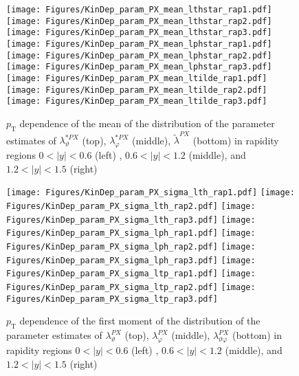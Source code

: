 \documentclass[12pt]{article}
\newcommand{\pT}{p_\mathrm{T}}
\newcommand{\absy}{\left |  y \right |}
\newcommand{\lamthPX}{\lambda^{\scriptscriptstyle PX}_\vartheta}
\newcommand{\lamphPX}{\lambda^{\scriptscriptstyle PX}_\varphi}
\newcommand{\lamthphPX}{\lambda^{\scriptscriptstyle PX}_{\vartheta \varphi}}
\newcommand{\lamtildePX}{\tilde{\lambda}^{\scriptscriptstyle PX}}
\newcommand{\lamthstarPX}{\lambda^{* \scriptscriptstyle PX}_\vartheta}
\newcommand{\lamphstarPX}{\lambda^{* \scriptscriptstyle PX}_\varphi}
\begin{document}
\begin{figure}[htbp]
\centering
\texttt{[image: Figures/KinDep\_param\_PX\_mean\_lthstar\_rap1.pdf]}
\texttt{[image: Figures/KinDep\_param\_PX\_mean\_lthstar\_rap2.pdf]}
\texttt{[image: Figures/KinDep\_param\_PX\_mean\_lthstar\_rap3.pdf]}
\texttt{[image: Figures/KinDep\_param\_PX\_mean\_lphstar\_rap1.pdf]}
\texttt{[image: Figures/KinDep\_param\_PX\_mean\_lphstar\_rap2.pdf]}
\texttt{[image: Figures/KinDep\_param\_PX\_mean\_lphstar\_rap3.pdf]}
\texttt{[image: Figures/KinDep\_param\_PX\_mean\_ltilde\_rap1.pdf]}
\texttt{[image: Figures/KinDep\_param\_PX\_mean\_ltilde\_rap2.pdf]}
\texttt{[image: Figures/KinDep\_param\_PX\_mean\_ltilde\_rap3.pdf]}
\caption{$\pT$ dependence of the mean of the distribution of the parameter estimates of $\lamthstarPX$ (top), $\lamphstarPX$ (middle), $\lamtildePX$ (bottom) in rapidity regions $0<\absy<0.6$ (left) , $0.6<\absy<1.2$ (middle), and $1.2<\absy<1.5$ (right)}
\end{figure}
\clearpage


\begin{figure}[htbp]
\centering
\texttt{[image: Figures/KinDep\_param\_PX\_sigma\_lth\_rap1.pdf]}
\texttt{[image: Figures/KinDep\_param\_PX\_sigma\_lth\_rap2.pdf]}
\texttt{[image: Figures/KinDep\_param\_PX\_sigma\_lth\_rap3.pdf]}
\texttt{[image: Figures/KinDep\_param\_PX\_sigma\_lph\_rap1.pdf]}
\texttt{[image: Figures/KinDep\_param\_PX\_sigma\_lph\_rap2.pdf]}
\texttt{[image: Figures/KinDep\_param\_PX\_sigma\_lph\_rap3.pdf]}
\texttt{[image: Figures/KinDep\_param\_PX\_sigma\_ltp\_rap1.pdf]}
\texttt{[image: Figures/KinDep\_param\_PX\_sigma\_ltp\_rap2.pdf]}
\texttt{[image: Figures/KinDep\_param\_PX\_sigma\_ltp\_rap3.pdf]}
\caption{$\pT$ dependence of the first moment of the distribution of the parameter estimates of $\lamthPX$ (top), $\lamphPX$ (middle), $\lamthphPX$ (bottom) in rapidity regions $0<\absy<0.6$ (left) , $0.6<\absy<1.2$ (middle), and $1.2<\absy<1.5$ (right)}
\end{figure}
\clearpage
\end{document}
